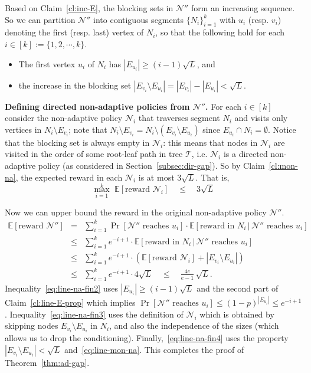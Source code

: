 \documentclass[11pt,letterpaper]{article}
\numberwithin{algorithm}{section}
\newcommand{\N}[0]{{\ensuremath{\mathcal{N}}}\xspace}
\newcommand{\T}{\ensuremath{\mathcal{T}}\xspace}
\newcommand{\E}{\mathbb{E}}
\begin{document}
Based on Claim~\ref{cl:inc-E}, the blocking sets in $\N''$ form an increasing sequence. So we can partition $\N''$ into contiguous segments $\{N_i\}_{i=1}^k$ with $u_i$ (resp. $v_i$) denoting the first (resp. last) vertex of $N_i$,  so that the following hold for each $i\in[k] := \{1,2,\cdots,k\}$.
\begin{itemize}
\item The first vertex $u_i$ of $N_i$ has $|E_{u_i}|\ge (i-1)\sqrt{L}$, and
\item the increase in the blocking set $|E_{v_i}\setminus E_{u_i}| = |E_{v_i}|-|E_{u_i}| < \sqrt{L}$.
\end{itemize}

{\bf Defining directed non-adaptive policies from $\N''$.} For each $i\in[k]$ consider the non-adaptive policy $\N_i$ that traverses segment $N_i$ and visits only vertices in $N_i\setminus E_{v_i}$; note that $N_i\setminus E_{v_i} = N_i\setminus \left(E_{v_i} \setminus E_{u_i}\right)$ since $E_{u_i}\cap N_i=\emptyset$. Notice that the blocking set is always empty in $\N_i$: this means that nodes in $\N_i$ are visited in the order of some root-leaf path in tree \T, i.e. $\N_i$ is a directed non-adaptive policy (as considered in Section~\ref{subsec:dir-gap}). So by Claim~\ref{cl:mon-na}, the expected reward in each $\N_i$ is at most $3\sqrt{L}$. That is,
\begin{equation}\label{eq:line-mon-na}
\max_{i=1}^k \,\, \E\left[\mbox{reward }\N_i\right] \quad \le \quad 3\sqrt{L}
\end{equation}

Now we can upper bound the reward in the original non-adaptive policy $\N''$.
\begin{eqnarray}
\E\left[\mbox{reward }\N''\right] & =& \sum_{i=1}^k \Pr\left[\N'' \mbox{ reaches }u_i\right] \cdot \E\left[\mbox{reward in }N_i \,|\, \N'' \mbox{ reaches }u_i \right] \label{eq:line-na-fin1}\\
&\le & \sum_{i=1}^k e^{-i+1} \cdot \E\left[\mbox{reward in }N_i \, |\, \N'' \mbox{ reaches }u_i \right] \label{eq:line-na-fin2}\\
&\le & \sum_{i=1}^k e^{-i+1} \cdot \left( \E\left[\mbox{reward }\N_i\right] +|E_{v_i}\setminus E_{u_i}|\right) \label{eq:line-na-fin3}\\
&\le & \sum_{i=1}^k e^{-i+1} \cdot 4\sqrt{L}\quad \le \quad \frac{4e}{e-1}\,\sqrt{L}.\label{eq:line-na-fin4}
\end{eqnarray}
Inequality~\eqref{eq:line-na-fin2} uses $|E_{u_i}|\ge (i-1)\sqrt{L}$ and the second part of Claim~\ref{cl:line-E-prop} which implies $\Pr[\N''\mbox{ reaches }u_i]\le (1-p)^{|E_{u_i}|}\le e^{-i+1}$. Inequality~\eqref{eq:line-na-fin3} uses the definition of $\N_i$ which is obtained by skipping nodes $E_{v_i}\setminus E_{u_i}$ in $N_i$, and also the independence of the sizes (which allows us to drop the conditioning). Finally,~\eqref{eq:line-na-fin4} uses the property $|E_{v_i}\setminus E_{u_i}|< \sqrt{L}$ and~\eqref{eq:line-mon-na}. This completes the proof of Theorem~\ref{thm:ad-gap}.
\end{document}
